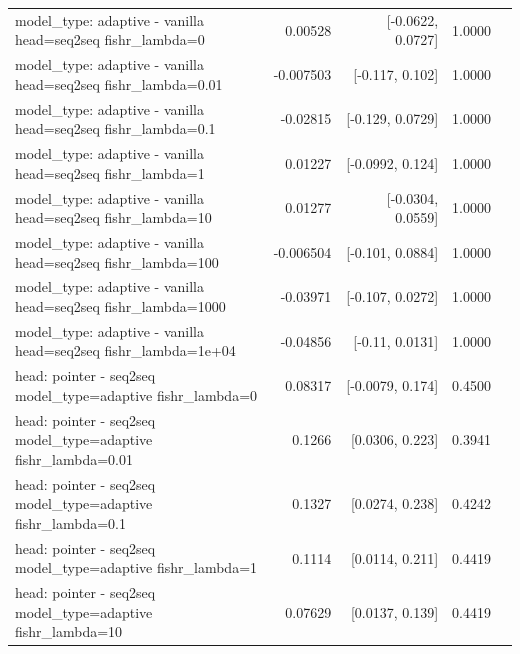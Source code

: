 \documentclass[10pt]{article}
\makeatletter
\newcommand{\stackcell}[1]{\begin{tabular}[t]{@{}l@{}}#1\end{tabular}}
\makeatother
\begin{document}
{\begin{longtable}{lrrrl}
\stackcell{model\_type: adaptive - vanilla\\\footnotesize head=seq2seq fishr\_lambda=0 } & 0.00528 & [-0.0622, 0.0727] & 1.0000 & \\
\stackcell{model\_type: adaptive - vanilla\\\footnotesize head=seq2seq fishr\_lambda=0.01 } & -0.007503 & [-0.117, 0.102] & 1.0000 & \\
\stackcell{model\_type: adaptive - vanilla\\\footnotesize head=seq2seq fishr\_lambda=0.1 } & -0.02815 & [-0.129, 0.0729] & 1.0000 & \\
\stackcell{model\_type: adaptive - vanilla\\\footnotesize head=seq2seq fishr\_lambda=1 } & 0.01227 & [-0.0992, 0.124] & 1.0000 & \\
\stackcell{model\_type: adaptive - vanilla\\\footnotesize head=seq2seq fishr\_lambda=10 } & 0.01277 & [-0.0304, 0.0559] & 1.0000 & \\
\stackcell{model\_type: adaptive - vanilla\\\footnotesize head=seq2seq fishr\_lambda=100 } & -0.006504 & [-0.101, 0.0884] & 1.0000 & \\
\stackcell{model\_type: adaptive - vanilla\\\footnotesize head=seq2seq fishr\_lambda=1000 } & -0.03971 & [-0.107, 0.0272] & 1.0000 & \\
\stackcell{model\_type: adaptive - vanilla\\\footnotesize head=seq2seq fishr\_lambda=1e+04 } & -0.04856 & [-0.11, 0.0131] & 1.0000 & \\
\stackcell{head: pointer - seq2seq\\\footnotesize model\_type=adaptive fishr\_lambda=0 } & 0.08317 & [-0.0079, 0.174] & 0.4500 & \\
\stackcell{head: pointer - seq2seq\\\footnotesize model\_type=adaptive fishr\_lambda=0.01 } & 0.1266 & [0.0306, 0.223] & 0.3941 & \\
\stackcell{head: pointer - seq2seq\\\footnotesize model\_type=adaptive fishr\_lambda=0.1 } & 0.1327 & [0.0274, 0.238] & 0.4242 & \\
\stackcell{head: pointer - seq2seq\\\footnotesize model\_type=adaptive fishr\_lambda=1 } & 0.1114 & [0.0114, 0.211] & 0.4419 & \\
\stackcell{head: pointer - seq2seq\\\footnotesize model\_type=adaptive fishr\_lambda=10 } & 0.07629 & [0.0137, 0.139] & 0.4419 & \\

\end{longtable}}
\end{document}
